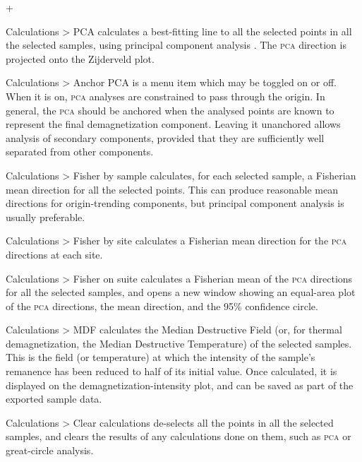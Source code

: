 \documentclass[a4paper]{article}
\newcommand{\menuitemlabel}[1]{%
\mbox{\textsf{#1}}\hfil}
\newenvironment{menuitemlist}%
{\begin{list}{}{%
\renewcommand{\makelabel}{\menuitemlabel}%
\setlength{\labelwidth}{35pt}%
\setlength{\leftmargin}%
             {\labelwidth+\labelsep}}}%
{\end{list}}
\newcommand{\caps}[1]{\textsc{#1}} %
\newcommand{\submenu}{ \textgreater{} } %
\begin{document}
\begin{menuitemlist}

\item[Calculations\submenu PCA] calculates a best-fitting line to all the
  selected points in all the selected samples, using principal component
  analysis \citep{kirschvink1980least}. The \caps{pca} direction is projected
  onto the Zijderveld plot.

\item[Calculations\submenu Anchor PCA] is a menu item which may be toggled on
  or off. When it is on, \caps{pca} analyses are constrained to pass through
  the origin. In general, the \caps{pca} should be anchored when the analysed
  points are known to represent the final demagnetization component. Leaving
  it unanchored allows analysis of secondary components, provided that they
  are sufficiently well separated from other components.

\item[Calculations\submenu Fisher by sample] calculates, for each selected
  sample, a Fisherian mean direction for all the selected points. This can
  produce reasonable mean directions for origin-trending components, but
  principal component analysis is usually preferable.

\item[Calculations\submenu Fisher by site] calculates a Fisherian mean
  direction for the \caps{pca} directions at each site.

\item[Calculations\submenu Fisher on suite] calculates a Fisherian mean of
  the \caps{pca} directions for all the selected samples, and opens a new
  window showing an equal-area plot of the \caps{pca} directions, the mean
  direction, and the 95\% confidence circle.

\item[Calculations\submenu MDF] calculates the Median Destructive Field (or,
  for thermal demagnetization, the Median Destructive Temperature) of the
  selected samples. This is the field (or temperature) at which the intensity
  of the sample's remanence has been reduced to half of its initial value.
  Once calculated, it is displayed on the demagnetization-intensity plot, and
  can be saved as part of the exported sample data.

\item[Calculations\submenu Clear calculations] de-selects all the points
in all the selected samples, and clears the results of any calculations done
on them, such as \caps{pca} or great-circle analysis.


\end{menuitemlist}
\end{document}
